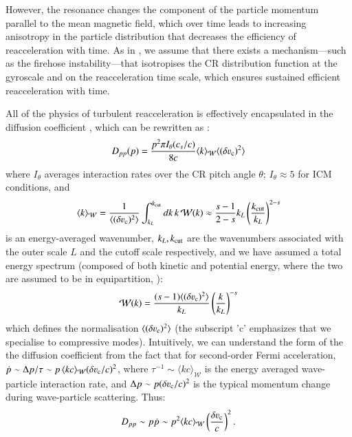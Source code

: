 \documentclass[fleqn,usenatbib,useAMS]{mnras}
\begin{document}
However, the resonance changes the component of the particle momentum
parallel to the mean magnetic field, which over time leads to
increasing anisotropy in the particle distribution that decreases the
efficiency of reacceleration with time. As in \citet{brunetti11}, we
assume that there exists a mechanism---such as the firehose
instability---that isotropises the CR distribution function at the
gyroscale and on the reacceleration time scale, which ensures
sustained efficient reacceleration with time.

All of the physics of turbulent reacceleration is effectively encapsulated in the diffusion coefficient \citep{brunetti07}, which can be rewritten as \citep{miniati15}:
\begin{equation}
D_{pp}(p) = \frac{ p^{2} \upi I_{\theta}(c_{s}/c)}{8 c} \langle k \rangle_{\mathcal{W}} \langle (\delta \varv_{\rm c})^{2} \rangle
\label{eqn:diffusion}
\end{equation}
where $I_{\theta}$ averages interaction rates over the CR pitch angle $\theta$; $I_{\theta} \approx 5$ for ICM conditions, and
\begin{equation}
\langle k \rangle_{\mathcal{W}} = \frac{1}{\langle (\delta \varv_{\rm c})^{2} \rangle} \int_{k_L}^{k_{\rm cut}} d k \, k \, \mathcal{W}(k) \approx \frac{s-1}{2-s} k_L \left( \frac{k_{\rm cut}}{k_L} \right)^{2-s} 
\label{eqn:k_W} 
\end{equation}
is an energy-averaged wavenumber, $k_L, k_{\rm cut}$ are the wavenumbers associated with the outer scale $L$ and the cutoff scale respectively, and we have assumed a total energy spectrum (composed of both kinetic and potential energy, where the two are assumed to be in equipartition, \citealt{sarkar11}): 
\begin{equation}
\mathcal{W}(k) = \frac{(s-1) \langle (\delta \varv_{\rm c})^{2} \rangle}{k_L} \left( \frac{k}{k_L} \right)^{-s} 
\label{eqn:Wk}
\end{equation}
which defines the normalisation $\langle (\delta \varv_{\rm c})^{2} \rangle$ (the subscript 'c' emphasizes that we specialise to compressive modes). Intuitively, we can understand the form of the the diffusion coefficient from the fact that for second-order Fermi acceleration, $\dot{p} \sim \Delta p/\tau \sim p\,\langle k c \rangle_{\mathcal{W}} (\delta \varv_{\rm c}/c)^{2}$, where $\tau^{-1} \sim \langle k c \rangle_{\mathcal{W}}$ is the energy averaged wave-particle interaction rate, and $\Delta p \sim p (\delta \varv_{\rm c}/c)^{2}$ is the typical momentum change during wave-particle scattering. Thus: 
\begin{equation}
  \label{eqn:Dpp}
D_{pp} \sim p \dot{p} \sim p^{2} \langle k c \rangle_{\mathcal{W}} \left( \frac{\delta \varv_{\rm c}}{c} \right)^{2}. 
\end{equation}
\end{document}
